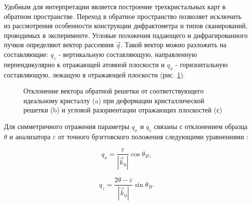 Удобным для интерпретации является построение трехкристальных карт в обратном пространстве.
Переход в обратное пространство позволяет исключить из рассмотрения особенности
конструкции дифрактометра и типов сканирований, проводимых в эксперименте.
 Угловые положения падающего и дифрагированного пучков
определяют вектор рассеяния $\vec{q}$. Такой вектор можно разложить на составляющие:
$q_z$ - вертикальную составляющую,
направленную перпендикулярно к отражающей атомной плоскости и $q_x$ - горизонтальную составляющую,
лежащую в отражающей плоскости (рис. \ref{ris:q_vector_reciprocal_space}).

\begin{figure}[H]
  \centering
  \hfill
  \hfill
  \caption{Отклонение вектора обратной решетки от соответствующего идеальному кристаллу (a)
  при деформации кристаллической решетки (b) и угловой разориентации отражающих плоскостей (с) }
  \label{ris:q_vector_reciprocal_space}
\end{figure}

Для симметричного отражения параметры $q_x$ и $q_z$ связаны с отклонением образца $\theta$ и
анализатора $\varepsilon$ от точного брэгговского положения следующими
уравнениями \cite{Tanner_1998}:

\begin{equation}
  q_x = \frac{\varepsilon}{|\vec{k}_0|} \cos \theta_B,
  \label{eq:qx_eqn}
\end{equation}

\begin{equation}
  q_z = \frac{2\theta - \varepsilon}{|\vec{k}_0|} \sin \theta_B.
  \label{eq:qz_eqn}
\end{equation}

